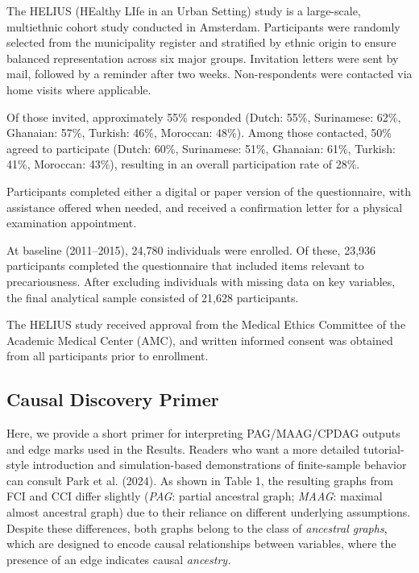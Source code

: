 \documentclass[
]{article}
\begin{document}
The HELIUS (HEalthy LIfe in an Urban Setting) study is a large-scale,
multiethnic cohort study conducted in Amsterdam. Participants were
randomly selected from the municipality register and stratified by
ethnic origin to ensure balanced representation across six major groups.
Invitation letters were sent by mail, followed by a reminder after two
weeks. Non-respondents were contacted via home visits where applicable.

Of those invited, approximately 55\% responded (Dutch: 55\%, Surinamese:
62\%, Ghanaian: 57\%, Turkish: 46\%, Moroccan: 48\%). Among those
contacted, 50\% agreed to participate (Dutch: 60\%, Surinamese: 51\%,
Ghanaian: 61\%, Turkish: 41\%, Moroccan: 43\%), resulting in an overall
participation rate of 28\%.

Participants completed either a digital or paper version of the
questionnaire, with assistance offered when needed, and received a
confirmation letter for a physical examination appointment.

At baseline (2011--2015), 24,780 individuals were enrolled. Of these,
23,936 participants completed the questionnaire that included items
relevant to precariousness. After excluding individuals with missing
data on key variables, the final analytical sample consisted of 21,628
participants.

The HELIUS study received approval from the Medical Ethics Committee of
the Academic Medical Center (AMC), and written informed consent was
obtained from all participants prior to enrollment.

\subsection{Causal Discovery Primer}\label{sec-causalprimer}

Here, we provide a short primer for interpreting PAG/MAAG/CPDAG outputs
and edge marks used in the Results. Readers who want a more detailed
tutorial-style introduction and simulation-based demonstrations of
finite-sample behavior can consult Park et al. (2024). As shown in Table
1, the resulting graphs from FCI and CCI differ slightly (\emph{PAG}:
partial ancestral graph; \emph{MAAG}: maximal almost ancestral graph)
due to their reliance on different underlying assumptions. Despite these
differences, both graphs belong to the class of \emph{ancestral graphs},
which are designed to encode causal relationships between variables,
where the presence of an edge indicates causal \emph{ancestry.}
\end{document}
